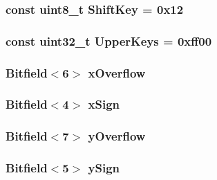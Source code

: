 \label{namespacePs2_a9f14f6a1f4da750d3ef23cf0a52428c5}
\hypertarget{namespacePs2_ab54ac8eb8bfad07e5819e768954d620d}{
\subsubsection[{ShiftKey}]{\setlength{\rightskip}{0pt plus 5cm}const uint8\_\-t {\bf ShiftKey} = 0x12}}
\label{namespacePs2_ab54ac8eb8bfad07e5819e768954d620d}
\hypertarget{namespacePs2_ac80d2dae8a45e683563043abfbb5ab16}{
\subsubsection[{UpperKeys}]{\setlength{\rightskip}{0pt plus 5cm}const {\bf uint32\_\-t} {\bf UpperKeys} = 0xff00}}
\label{namespacePs2_ac80d2dae8a45e683563043abfbb5ab16}
\hypertarget{namespacePs2_af3731450409d7bf437330fba9b0f47ad}{
\subsubsection[{xOverflow}]{\setlength{\rightskip}{0pt plus 5cm}Bitfield$<$6$>$ {\bf xOverflow}}}
\label{namespacePs2_af3731450409d7bf437330fba9b0f47ad}
\hypertarget{namespacePs2_a98870caa9bd24727a03e11ce4743b48d}{
\subsubsection[{xSign}]{\setlength{\rightskip}{0pt plus 5cm}Bitfield$<$4$>$ {\bf xSign}}}
\label{namespacePs2_a98870caa9bd24727a03e11ce4743b48d}
\hypertarget{namespacePs2_a1fe8542266acaa70cb542dd34f7a3efd}{
\subsubsection[{yOverflow}]{\setlength{\rightskip}{0pt plus 5cm}Bitfield$<$7$>$ {\bf yOverflow}}}
\label{namespacePs2_a1fe8542266acaa70cb542dd34f7a3efd}
\hypertarget{namespacePs2_a9e5e7f9b5d4b0354b04839a29f554cfe}{
\subsubsection[{ySign}]{\setlength{\rightskip}{0pt plus 5cm}Bitfield$<$5$>$ {\bf ySign}}}
\label{namespacePs2_a9e5e7f9b5d4b0354b04839a29f554cfe}

